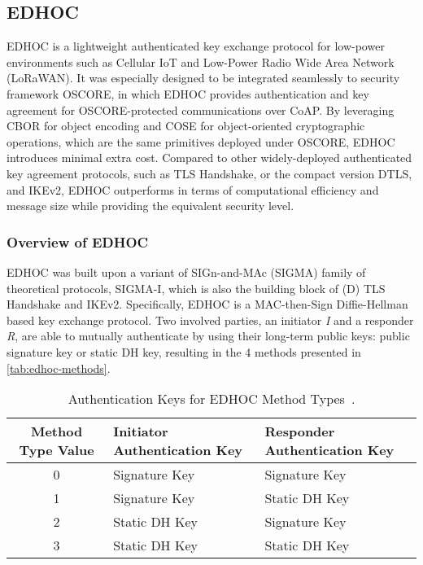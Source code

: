 \subsection{EDHOC}
EDHOC is a lightweight authenticated key exchange
protocol for low-power environments such as Cellular IoT and Low-Power Radio Wide Area Network
(LoRaWAN)\@. It was especially designed to be integrated seamlessly to security framework
OSCORE, in which EDHOC provides authentication and key agreement for OSCORE-protected
communications over CoAP\@. By leveraging CBOR for object encoding and COSE for object-oriented
cryptographic operations, which are the same primitives deployed under OSCORE, EDHOC introduces
minimal extra cost. Compared to other widely-deployed authenticated key agreement protocols,
such as TLS Handshake, or
the compact version DTLS, and IKEv2, EDHOC outperforms in terms of computational
efficiency and message size while providing the equivalent security level.

\subsubsection{Overview of EDHOC}
EDHOC was built upon a variant of SIGn-and-MAc (SIGMA) family of theoretical protocols, SIGMA-I,
which is also the building block of (D) TLS Handshake and IKEv2. Specifically, EDHOC is a MAC-then-Sign
Diffie-Hellman based key exchange protocol. Two involved parties, an initiator \textit{I} and a responder
\textit{R}, are able to mutually authenticate by using their long-term public keys: public signature
key or static DH key, resulting in the 4 methods presented in \autoref{tab:edhoc-methods}.

\begin{table}
    \centering
    \begin{tabular}{|c|p{5cm}|p{5cm}|}
        \hline
        Method Type Value & Initiator Authentication Key & Responder Authentication Key\\
        \hline
        0 & Signature Key & Signature Key\\
        1 & Signature Key & Static DH Key\\
        2 & Static DH Key & Signature Key\\
        3 & Static DH Key & Static DH Key\\
        \hline
    \end{tabular}
    \caption{Authentication Keys for EDHOC Method Types~\cite{edhoc-rfc}.}
    \label{tab:edhoc-methods}
\end{table}

